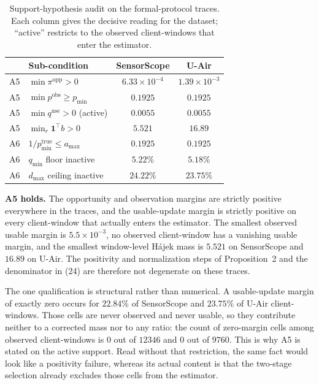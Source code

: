 \begin{table}[!t]
\centering
\caption{Support-hypothesis audit on the formal-protocol traces.  Each column
gives the decisive reading for the dataset; ``active'' restricts to the
observed client-windows that enter the estimator.}
\label{tab:app_a5_a6_audit}
\footnotesize
\setlength{\tabcolsep}{3pt}
\begin{tabular*}{\columnwidth}{@{\extracolsep{\fill}}llcc}
\toprule
 & Sub-condition & SensorScope & U-Air\\
\midrule
A5 & $\min \pi^{\mathrm{opp}}>0$ & $6.33\times10^{-4}$ & $1.39\times10^{-3}$\\
A5 & $\min p^{\mathrm{obs}}\ge p_{\min}$ & $0.1925$ & $0.1925$\\
A5 & $\min q^{\mathrm{use}}>0$ (active) & $0.0055$ & $0.0055$\\
A5 & $\min_r \mathbf{1}^{\top}b>0$ & $5.521$ & $16.89$\\
\midrule
A6 & $1/p^{\mathrm{true}}_{\min}\le a_{\max}$ & $0.1925$ & $0.1925$\\
A6 & $q_{\min}$ floor inactive & $5.22\%$ & $5.18\%$\\
A6 & $d_{\max}$ ceiling inactive & $24.22\%$ & $23.75\%$\\
\bottomrule
\end{tabular*}
\end{table}

\noindent\textbf{A5 holds.}  The opportunity and observation margins are
strictly positive everywhere in the traces, and the usable-update margin is
strictly positive on every client-window that actually enters the estimator.
The smallest observed usable margin is $5.5\times10^{-3}$, no observed
client-window has a vanishing usable margin, and the smallest window-level
H\'ajek mass is $5.521$ on SensorScope and $16.89$ on U-Air.  The positivity
and normalization steps of Proposition~2 and the denominator in
(24) are therefore not degenerate on these traces.

The one qualification is structural rather than numerical.  A usable-update
margin of exactly zero occurs for $22.84\%$ of SensorScope and $23.75\%$ of
U-Air client-windows.  Those cells are never observed and never usable, so
they contribute neither to a corrected mass nor to any ratio: the count of
zero-margin cells among observed client-windows is $0$ out of $12346$ and $0$
out of $9760$.  This is why A5 is stated on the active support.  Read without
that restriction, the same fact would look like a positivity failure, whereas
its actual content is that the two-stage selection already excludes those
cells from the estimator.

